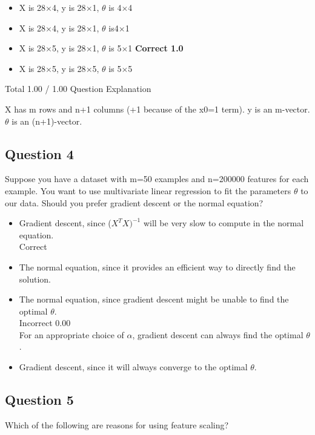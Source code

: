 \documentclass[11pt]{article} %
\begin{document}
\begin{itemize}
	\item X is 28$\times$4, y is 28$\times$1, $\theta$ is 4$\times$4			
	\item X is 28$\times$4, y is 28$\times$1, $\theta$ is4$\times$1			
	\item X is 28$\times$5, y is 28$\times$1, $\theta$ is 5$\times$1	\textbf{Correct	1.0}	
	\item X is 28$\times$5, y is 28$\times$5, $\theta$ is 5$\times$5
\end{itemize}			
Total		1.00 / 1.00	
Question Explanation

X has m rows and n+1 columns (+1 because of the x0=1 term). y is an m-vector. $\theta$ is an (n+1)-vector.
\subsection*{Question 4}
Suppose you have a dataset with m=50 examples and n=200000 features for each example. 
You want to use multivariate linear regression to fit the parameters $\theta$ to our data. 
Should you prefer gradient descent or the normal equation?

\begin{itemize}
	\item Gradient descent, since ($X^TX)^{-1}$ will be very slow to compute in the normal equation.	
	\\ Correct
	
	\item The normal equation, since it provides an efficient way to directly find the solution.			
	\item The normal equation, since gradient descent might be unable to find the optimal $\theta$.	
	\\Incorrect	0.00	 \\ For an appropriate choice of $\alpha$, gradient descent can always find the optimal $\theta$.
	\item Gradient descent, since it will always converge to the optimal $\theta$.			
\end{itemize}	
\subsection*{Question 5}
Which of the following are reasons for using feature scaling?
\end{document}

